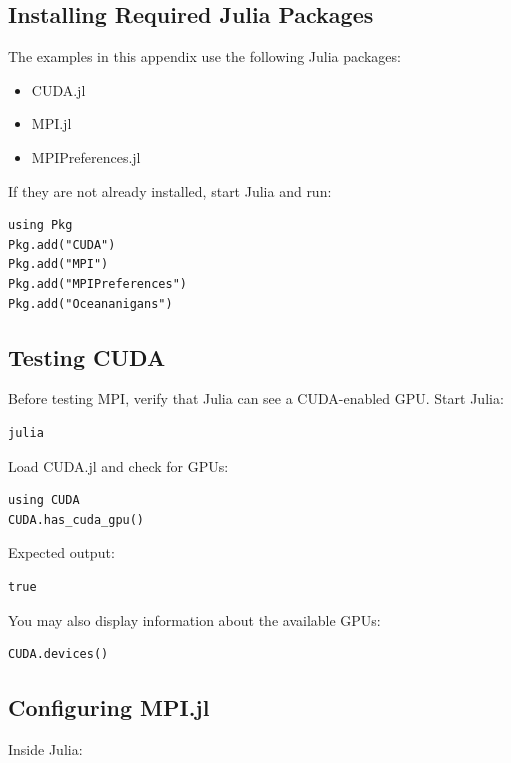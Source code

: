 \subsection{Installing Required Julia Packages} 

The examples in this appendix use the following Julia packages: 

\begin{itemize} 
\item CUDA.jl 
\item MPI.jl 
\item MPIPreferences.jl 
\end{itemize} 

If they are not already installed, start Julia and run: 


\begin{lstlisting} 
using Pkg 
Pkg.add("CUDA") 
Pkg.add("MPI") 
Pkg.add("MPIPreferences") 
Pkg.add("Oceananigans") 
\end{lstlisting}

\subsection{Testing CUDA} 

Before testing MPI, verify that Julia can see a CUDA-enabled GPU. Start Julia: 

\begin{lstlisting} 
julia 
\end{lstlisting} 

Load CUDA.jl and check for GPUs: 

\begin{lstlisting} 
using CUDA 
CUDA.has_cuda_gpu() 
\end{lstlisting} 

Expected output: 

\begin{lstlisting} 
true 
\end{lstlisting} 

You may also display information about the available GPUs: 

\begin{lstlisting} 
CUDA.devices() 
\end{lstlisting}

\subsection{Configuring MPI.jl} 

Inside Julia: 

